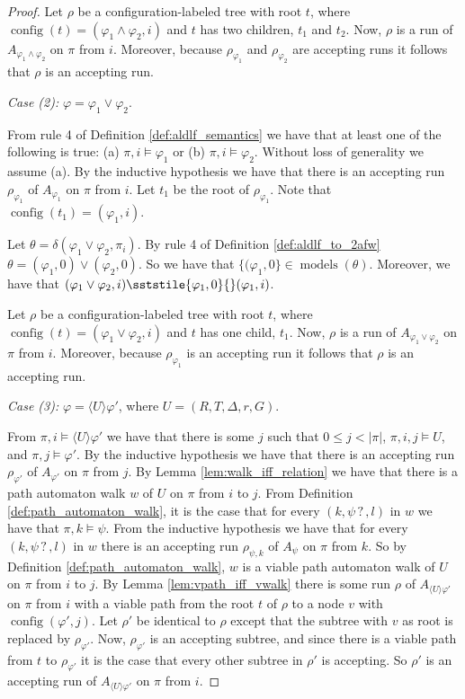 \documentclass[10pt,a4paper]{amsart}
\theoremstyle{plain}
\theoremstyle{definition}
\theoremstyle{definition}
\newcommand{\sderives}[1]{\sststile{#1}{}}
\newcommand{\dbox}[1]{\langle #1 \rangle}
\DeclareMathOperator{\config}{config}
\DeclareMathOperator{\?}{?}
\DeclareMathOperator{\mymodels}{models}
\begin{document}
\begin{proof}
    Let $\rho$ be a configuration-labeled tree with root $t$, where $\config(t) = (\varphi_1 \wedge \varphi_2,i)$
    and $t$ has two children, $t_1$ and $t_2$. Now, $\rho$ is a run of $A_{\varphi_1 \wedge \varphi_2}$ on $\pi$ from $i$.
    Moreover, because $\rho_{\varphi_1}$ and $\rho_{\varphi_2}$ are accepting runs it follows that $\rho$ is an accepting run.


    \textit{Case (2):} $\varphi = \varphi_1 \vee \varphi_2$.

    From rule 4 of Definition \ref{def:aldlf_semantics} we have that at least one of the following is true: (a) $\pi,i \models \varphi_1$
    or (b) $\pi,i \models \varphi_2$. Without loss of generality we assume (a). By the inductive hypothesis we have that there is
    an accepting run $\rho_{\varphi_1}$ of $A_{\varphi_1}$ on $\pi$ from $i$. Let $t_1$ be the root of $\rho_{\varphi_1}$. Note that
    $\config(t_1) = (\varphi_1,i)$.

    Let $\theta = \delta(\varphi_1 \vee \varphi_2,\pi_i)$. By rule 4 of Definition \ref{def:aldlf_to_2afw}
    $\theta = (\varphi_1,0) \vee (\varphi_2,0)$.
    So we have that $\{(\varphi_1,0 \} \in \mymodels(\theta)$. Moreover, we have that
    $(\varphi_1 \vee \varphi_2,i) \sderives{\varphi_1,0} (\varphi_1,i)$.

    Let $\rho$ be a configuration-labeled tree with root $t$, where $\config(t) = (\varphi_1 \vee \varphi_2,i)$
    and $t$ has one child, $t_1$. Now, $\rho$ is a run of $A_{\varphi_1 \vee \varphi_2}$ on $\pi$ from $i$.
    Moreover, because $\rho_{\varphi_1}$ is an accepting run it follows that $\rho$ is an accepting run.


    \textit{Case (3):} $\varphi = \dbox{U}\varphi'$, where $U = (R,T,\Delta,r,G)$.

    From $\pi,i \models \dbox{U}\varphi'$ we have that there is some $j$ such that $0 \leq j < |\pi|$,
    $\pi,i,j \models U$, and $\pi,j \models \varphi'$. By the inductive hypothesis we have that there is an accepting run
    $\rho_{\varphi'}$ of $A_{\varphi'}$ on $\pi$ from $j$.
    By Lemma \ref{lem:walk_iff_relation} we have that there is a path automaton walk $w$ of $U$ on
    $\pi$ from $i$ to $j$. From Definition \ref{def:path_automaton_walk}, it is the case that for every $(k, \psi \? ,l)$ in $w$ we have that $\pi,k \models \psi$.
    From the inductive hypothesis we have that for every $(k, \psi \? ,l)$ in $w$ there is an accepting run $\rho_{\psi,k}$ of $A_\psi$ on
    $\pi$ from $k$. So by Definition \ref{def:path_automaton_walk}, $w$ is a viable path automaton walk of $U$ on $\pi$ from $i$ to $j$.
    By Lemma \ref{lem:vpath_iff_vwalk}
    there is some run $\rho$ of $A_{\dbox{U}\varphi'}$ on $\pi$ from $i$ with a viable path from the root $t$ of $\rho$ to a node
    $v$ with $\config(\varphi',j)$. Let $\rho'$ be identical to $\rho$ except that the subtree with $v$ as root is replaced by
    $\rho_{\varphi'}$. Now, $\rho_{\varphi'}$ is an accepting subtree, and since there is a viable path from $t$ to $\rho_{\varphi'}$
    it is the case that every other subtree in $\rho'$ is accepting. So $\rho'$ is an accepting run of $A_{\dbox{U}\varphi'}$ on $\pi$ from $i$.


\end{proof}
\end{document}
